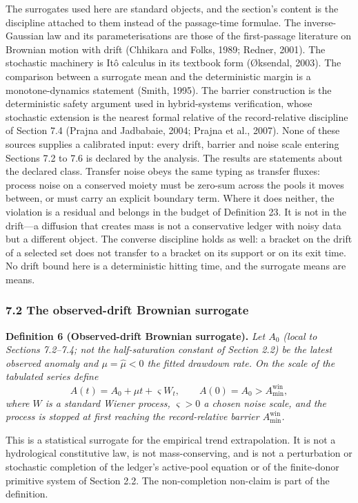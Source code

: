 \documentclass[11pt]{article}
\begin{document}
The surrogates used here are standard objects, and the section's content is the discipline attached to them instead of the passage-time formulae. The inverse-Gaussian law and its parameterisations are those of the first-passage literature on Brownian motion with drift (Chhikara and Folks, 1989; Redner, 2001). The stochastic machinery is It\^o calculus in its textbook form (\O{}ksendal, 2003). The comparison between a surrogate mean and the deterministic margin is a monotone-dynamics statement (Smith, 1995). The barrier construction is the deterministic safety argument used in hybrid-systems verification, whose stochastic extension is the nearest formal relative of the record-relative discipline of Section 7.4 (Prajna and Jadbabaie, 2004; Prajna et al., 2007). None of these sources supplies a calibrated input: every drift, barrier and noise scale entering Sections 7.2 to 7.6 is declared by the analysis. The results are statements about the declared class. Transfer noise obeys the same typing as transfer fluxes: process noise on a conserved moiety must be zero-sum across the pools it moves between, or must carry an explicit boundary term. Where it does neither, the violation is a residual and belongs in the budget of Definition 23. It is not in the drift---a diffusion that creates mass is not a conservative ledger with noisy data but a different object. The converse discipline holds as well: a bracket on the drift of a selected set does not transfer to a bracket on its support or on its exit time. No drift bound here is a deterministic hitting time, and the surrogate means are means.


\subsubsection{7.2 The observed-drift Brownian
surrogate}\label{the-observed-drift-brownian-surrogate}

\textbf{Definition 6 (Observed-drift Brownian surrogate).} \emph{Let
\(A_0\) (local to Sections 7.2--7.4; not the half-saturation constant of
Section 2.2) be the latest observed anomaly and
\(\mu = \widehat\mu < 0\) the fitted drawdown rate. On the scale of the
tabulated series define}
\[A(t) = A_0 + \mu t + \varsigma W_t, \qquad A(0) = A_0 > A_{\min}^{\mathrm{win}},\]
\emph{where \(W\) is a standard Wiener process, \(\varsigma > 0\) a
chosen noise scale, and the process is stopped at first reaching the
record-relative barrier \(A_{\min}^{\mathrm{win}}\).}

This is a statistical surrogate for the empirical trend extrapolation.
It is not a hydrological constitutive law, is not mass-conserving, and
is not a perturbation or stochastic completion of the ledger's
active-pool equation or of the finite-donor primitive system of Section
2.2. The non-completion non-claim is part of the definition.
\end{document}
